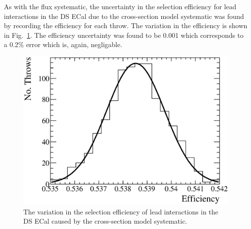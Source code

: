 \newline
As with the flux systematic, the uncertainty in the selection efficiency for lead interactions in the DS ECal due to the cross-section model systematic was found by recording the efficiency for each throw.  The variation in the efficiency is shown in Fig.~\ref{fig:XSecEfficiencyVariation}.  The efficiency uncertainty was found to be 0.001 which corresponds to a 0.2$\%$ error which is, again, negligable.
\begin{figure}
  \centering
  \includegraphics[width=12cm]{images/measurement/systematics/xsec/xsec_efficiency_variation.eps}
  \caption{The variation in the selection efficiency of lead interactions in the DS ECal caused by the cross-section model systematic.}
  \label{fig:XSecEfficiencyVariation}
\end{figure}
\newline
\newline
